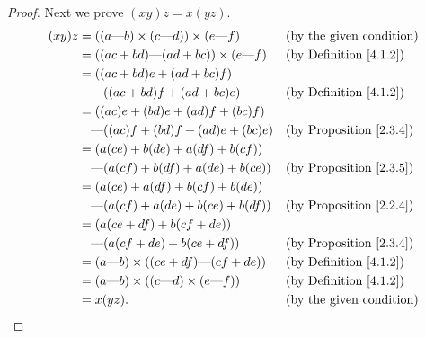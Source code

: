 \begin{proof}
    Next we prove \((xy)z = x(yz)\).
    \begin{align*}
        (xy)z & = ((a \text{---} b) \times (c \text{---} d)) \times (e \text{---} f) &  & \text{(by the given condition)}     \\
              & = ((ac + bd) \text{---} (ad + bc)) \times (e \text{---} f)           &  & \text{(by Definition \ref{4.1.2})}  \\
              & = ((ac + bd)e + (ad + bc)f)                                                                                   \\
              & \quad \text{---} ((ac + bd)f + (ad + bc)e)                           &  & \text{(by Definition \ref{4.1.2})}  \\
              & = ((ac)e + (bd)e + (ad)f + (bc)f)                                                                             \\
              & \quad \text{---} ((ac)f + (bd)f + (ad)e + (bc)e)                     &  & \text{(by Proposition \ref{2.3.4})} \\
              & = (a(ce) + b(de) + a(df) + b(cf))                                                                             \\
              & \quad \text{---} (a(cf) + b(df) + a(de) + b(ce))                     &  & \text{(by Proposition \ref{2.3.5})} \\
              & = (a(ce) + a(df) + b(cf) + b(de))                                                                             \\
              & \quad \text{---} (a(cf) + a(de) + b(ce) + b(df))                     &  & \text{(by Proposition \ref{2.2.4})} \\
              & = (a(ce + df) + b(cf + de))                                                                                   \\
              & \quad \text{---} (a(cf + de) + b(ce + df))                           &  & \text{(by Proposition \ref{2.3.4})} \\
              & = (a \text{---} b) \times ((ce + df) \text{---} (cf + de))           &  & \text{(by Definition \ref{4.1.2})}  \\
              & = (a \text{---} b) \times ((c \text{---} d) \times (e \text{---} f)) &  & \text{(by Definition \ref{4.1.2})}  \\
              & = x(yz).                                                             &  & \text{(by the given condition)}
    \end{align*}


\end{proof}

